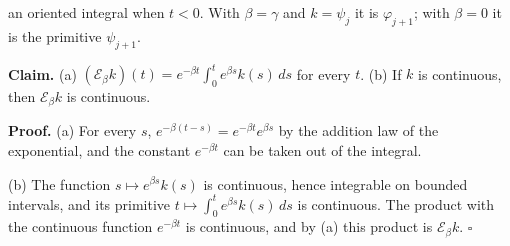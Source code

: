 \documentclass[11pt,a4paper]{article}
\begin{document}
an oriented integral when \(t<0\). With \(\beta=\gamma\) and \(k=\psi_j\) it is \(\varphi_{j+1}\); with \(\beta=0\) it is the primitive \(\psi_{j+1}\).




\textbf{Claim.} (a) \((\mathcal E_\beta k)(t)=e^{-\beta t}\int_0^te^{\beta s}k(s)\,ds\) for every \(t\). (b) If \(k\) is continuous, then \(\mathcal E_\beta k\) is continuous.




\textbf{Proof.} (a) For every \(s\), \(e^{-\beta(t-s)}=e^{-\beta t}e^{\beta s}\) by the addition law of the exponential, and the constant \(e^{-\beta t}\) can be taken out of the integral.




(b) The function \(s\mapsto e^{\beta s}k(s)\) is continuous, hence integrable on bounded intervals, and its primitive \(t\mapsto\int_0^te^{\beta s}k(s)\,ds\) is continuous. The product with the continuous function \(e^{-\beta t}\) is continuous, and by (a) this product is \(\mathcal E_\beta k\). \(\square\)
\end{document}
